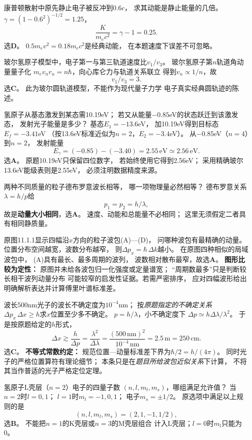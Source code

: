 \problemtext 康普顿散射中原先静止电子被反冲到$0.6c$，
求其动能是静止能量的几倍。
\workings
$\gamma=(1-0.6^2)^{-1/2}=1.25$，
\[
\boxed{\frac{K}{m_ec^2}=\gamma-1=0.25}.
\]
选\textbf{D}。
\crosscheck $0.5m_ev^2=0.18m_ec^2$是经典动能，
在本题速度下误差不可忽略。

\problemtext 玻尔氢原子模型中，电子第一与第三轨道速度比$v_1/v_3$。
\workings
玻尔氢原子第$n$轨道角动量量子化
$m_ev_nr_n=n\hbar$，向心库仑力与轨道关系联立
得到$v_n\propto1/n$，故
\[
\boxed{v_1/v_3=3}.
\]
选\textbf{C}。
\crosscheck 此为玻尔圆轨道模型，不能作为现代量子力学
电子真实经典圆轨迹的陈述。

\problemtext 氢原子从基态激发到某态需10.19eV；
若又从能量$-0.85$eV的状态跃迁到该激发态，
发射光子能量是多少？
\workings
基态$E_1=-13.6$eV，
加10.19eV得到目标态$E_f=-3.41$eV
（按13.6eV标准近似为$n=2$，$E_2=-3.4$eV）。
从$-0.85$eV（$n=4$）到$n=2$，
发射能量
\[
\boxed{E_\gamma=(-0.85)-(-3.40)=2.55\,\mathrm{eV}
\simeq2.56\,\mathrm{eV}}.
\]
选\textbf{A}。
\crosscheck 原题10.19eV只保留四位数字，
若始终使用它得到2.56eV；
采用精确玻尔13.6eV能级表则是2.55eV，
必须注明数据精度来源。

\problemtext 两种不同质量的粒子德布罗意波长相等，
哪一项物理量必然相等？
\workings
德布罗意关系
$\lambda=h/p$给
\[
\boxed{p_1=p_2=h/\lambda},
\]
故是\textbf{动量大小相同}，选\textbf{A}。
\crosscheck 速度、动能和总能量不必相同；
这里无须假定二者具有相同静质量。

\problemtext 原图11.1.1显示四幅沿$x$方向的粒子波包(A)—(D)，
问哪种波包有最精确的动量。
\workings
位置分布空间越宽，波数分布越窄，
则$\Delta p_x=\hbar\,\Delta k$越小。
在原图四种相似的局域波包中，
(A)具有最长、最多周期的波列，
波数相对散布最窄，故选\textbf{A}。
\crosscheck \textbf{图形比较为定性：}
原图并未给各波包归一化强度或定量谱宽；
“周期数最多”只是判断较长相干波列动量分布
可能较窄的启发性证据。若需严密排序，
应对四幅波形给出明确解析表达并计算傅里叶谱标准差。

\problemtext 波长500nm光子的波长不确定度为$10^{-4}$nm；
按\emph{原题指定的不确定关系}
$\Delta p_x\,\Delta x\ge h$求$x$位置至少多不确定。
\workings
$p=h/\lambda$，小不确定度下
$\Delta p\simeq h\Delta\lambda/\lambda^2$。
于是按原题给定的$h$形式，
\[
\boxed{\Delta x\gtrsim\frac h{\Delta p}
=\frac{\lambda^2}{\Delta\lambda}
=\frac{(500\,\mathrm{nm})^2}{10^{-4}\,\mathrm{nm}}
=2.5\,\mathrm m=250\,\mathrm{cm}}.
\]
选\textbf{C}。
\crosscheck \textbf{不等式常数约定：}
规范位置—动量标准差下界为$\hbar/2=h/(4\pi)$。
同时光子的严格位置算符有理论细节；
本条只是在\emph{题目所给波包近似关系}下计算，
不将其当作普适的光子严格定位定理。

\problemtext 氢原子L壳层（$n=2$）电子的四量子数
$(n,l,m_l,m_s)$，哪组满足允许值？
\workings
当$n=2$时$l=0,1$；
$l=1$时$m_l=-1,0,1$；
电子$m_s=\pm1/2$。
原选项中满足以上规则的是
\[
\boxed{(n,l,m_l,m_s)=(2,1,-1,1/2)},
\]
选\textbf{B}。
\crosscheck 不能把$n=1$的K壳层或$n=3$的M壳层组合
计入L壳层；$l=0$时$m_l$只能为0。
